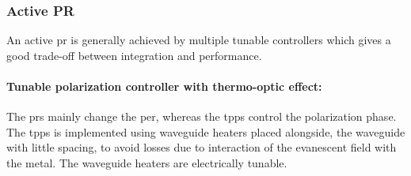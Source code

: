 \documentclass[../report.tex]{subfiles}
\begin{document}
		\subsubsection{Active PR}
An active \gls{pr} is generally achieved by multiple tunable controllers which gives a good trade-off between integration and performance. 
	\paragraph*{Tunable polarization controller with thermo-optic effect:} The \gls{pr}s mainly change the \gls{per}, whereas the \gls{tpps} control the polarization phase. The \gls{tpps} is implemented using waveguide heaters placed alongside, the waveguide with little spacing, to avoid losses due to interaction of the evanescent field with the metal. The waveguide heaters are electrically tunable.	
	
\end{document}
